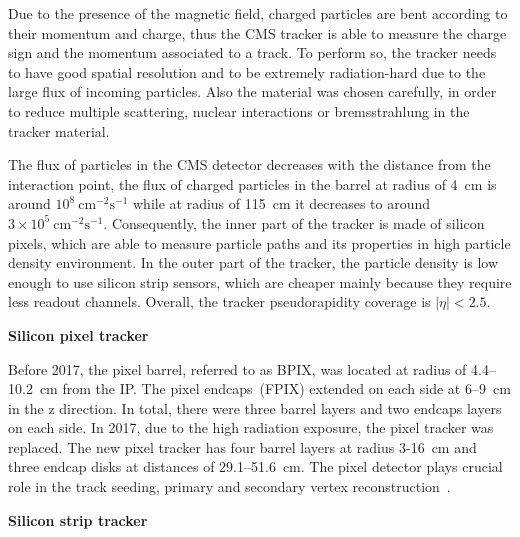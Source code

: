 Due to the presence of the magnetic field, charged particles are bent according to their momentum and charge, thus the CMS tracker is able to measure the charge sign and the momentum associated to a track. To perform so, the tracker needs to have good spatial resolution and to be extremely radiation-hard due to the large flux of incoming particles. Also the material was chosen carefully, in order to reduce multiple scattering, nuclear interactions or bremsstrahlung in the tracker material.

The flux of particles in the CMS detector decreases with the distance from the interaction point, the flux of charged particles in the barrel at radius of 4~cm is around $10^{8}~\mathrm{cm^{-2}s^{-1}}$ while at radius of 115~cm it decreases to around $3 \times10^{5}~\mathrm{cm^{-2}s^{-1}}$. Consequently, the inner part of the tracker is made of silicon pixels, which are able to measure particle paths and its properties in high particle density environment. In the outer part of the tracker, the particle density is low enough to use silicon strip sensors, which are cheaper mainly because they require less readout channels. Overall, the tracker pseudorapidity coverage is  $|\eta| < 2.5$.


\textbf{Silicon pixel tracker}

Before 2017, the pixel barrel, referred to as BPIX,  was located at radius of 4.4--10.2~cm from the IP. The pixel endcaps~(FPIX) extended on each side at 6--9~cm in the z direction. In total, there were three barrel layers and two endcaps layers on each side. In 2017, due to the high radiation exposure, the pixel tracker was replaced. The new pixel tracker has four barrel layers at radius 3-16~cm and three endcap disks at distances of 29.1--51.6~cm. The pixel detector plays crucial role in the track seeding, primary and secondary vertex reconstruction~\cite{CMS:2012sda}. 



\textbf{Silicon strip tracker}


